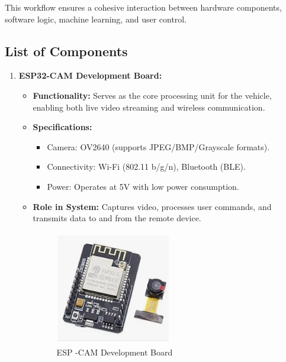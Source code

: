 \documentclass[12pt,a4paper]{report}
\begin{document}
This workflow ensures a cohesive interaction between hardware components, software logic, machine learning, and user control.











\label{List of Components}
\subsection{List of Components}

\begin{enumerate}
    \item \textbf{ESP32-CAM Development Board:}
    \begin{itemize}
        \item \textbf{Functionality:} Serves as the core processing unit for the vehicle, enabling both live video streaming and wireless communication.
        \item \textbf{Specifications:}
        \begin{itemize}
            \item Camera: OV2640 (supports JPEG/BMP/Grayscale formats).
            \item Connectivity: Wi-Fi (802.11 b/g/n), Bluetooth (BLE).
            \item Power: Operates at 5V with low power consumption.
        \end{itemize}
        \item \textbf{Role in System:} Captures video, processes user commands, and transmits data to and from the remote device. \\ 
        
\begin{figure}[H]
    \centering
    \begin{minipage}{0.45\textwidth}
        \centering
        \includegraphics[width=5cm, height=5cm]{espCam}
        \caption{ESP -CAM Development Board}
        \label{fig:espCam}
    \end{minipage}
\end{figure}


\end{itemize}
\end{enumerate}
\end{document}
